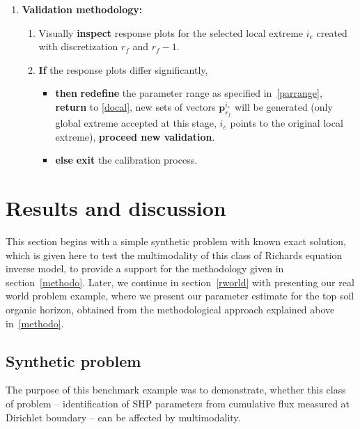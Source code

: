 \documentclass[review,times,3p,10pt]{elsarticle}
\renewcommand{\vec}{\mathbf}
\begin{document}
\begin{enumerate}[label={\bf \Roman* .}]
\begin{enumerate}
       \item {\bf Validation methodology:}
       
       \begin{enumerate}
       \item Visually {\bf inspect} response  plots for the selected local extreme $i_e$ created with discretization $r_f$ and $r_f-1$.
       \item \label{cond} {\bf If} the response plots differ significantly,
       \begin{itemize}
          \item {\bf then} {\bf redefine} the parameter range as specified in~\eqref{parrange}, {\bf return} to \ref{docal},  new sets of vectors  $\vec{p}_{r_f}^{i_e}$ will be generated (only global extreme accepted at this stage,  $i_e$ points to the original local extreme), {\bf proceed new validation}.  
          \item {\bf else} {\bf exit} the calibration process.
      \end{itemize}
\end{enumerate}

\end{enumerate}
\end{enumerate}






 



\section{Results and discussion} 

This section begins with  a simple synthetic problem with known exact solution, which is given here to test the multimodality of this class of Richards equation inverse model, to provide a support for the methodology given in section~\ref{methodo}. Later,  we continue in section~\ref{rworld} with presenting our real world problem example, where we  present our parameter estimate for the top soil organic horizon, obtained from the methodological approach explained above in~\ref{methodo}.

\subsection{Synthetic problem}
 \label{benchmarks}
 
The purpose of this benchmark example was to demonstrate, whether this class of problem -- identification of SHP parameters from cumulative flux measured at Dirichlet boundary -- can be affected by multimodality.
\end{document}
